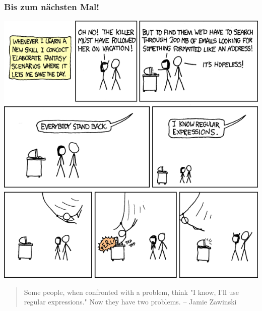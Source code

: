 \begin{frame}
\frametitle{Bis zum nächsten Mal!}
\begin{center}\includegraphics[height=0.6\textheight]{images/regular_expressions.png}\end{center}
\vspace{-0.5cm}

\small{\begin{quote}
Some people, when confronted with a problem, think "I know, I'll use regular expressions." Now they have two problems. -- Jamie Zawinski
\end{quote}}

\end{frame}

